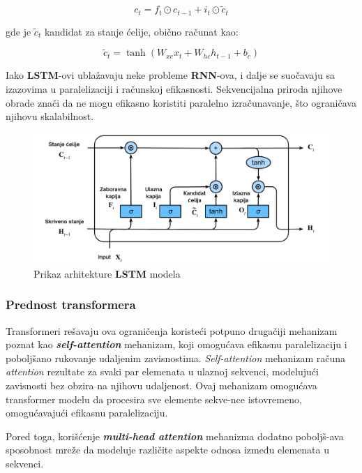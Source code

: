\documentclass[12pt]{article}
\begin{document}
   \[ c_t = f_t \odot c_{t-1} + i_t \odot \tilde{c}_t \]

   gde je \( \tilde{c}_t \) kandidat za stanje ćelije, obično računat kao:

   \[ \tilde{c}_t = \tanh(W_{xc} x_t + W_{hc} h_{t-1} + b_c) \]

   Iako \textbf{LSTM}-ovi ublažavaju neke probleme \textbf{RNN}-ova, i dalje se suočavaju sa 
   izazovima u paralelizaciji i računskoj efikasnosti. Sekvencijalna priroda njihove
   obrade znači da ne mogu efikasno koristiti paralelno izračunavanje, što ograničava njihovu 
   skalabilnost.

   \begin{figure}[h!]
      \centering
      \vspace{1.5cm} %
      \includegraphics[width=1\textwidth]{lstm.png}
      \caption{Prikaz arhitekture \textbf{LSTM} modela}
      \label{fig:lstm}
   \end{figure}

   \subsubsection{Prednost transformera}
   Transformeri rešavaju ova ograničenja koristeći potpuno drugačiji mehanizam poznat kao 
   \textbf{\textit{self-attention}} mehanizam, koji omogućava efikasnu paralelizaciju i poboljšano 
   rukovanje udaljenim zavisnostima. \textit{Self-attention} mehanizam računa \textit{attention} 
   rezultate za svaki par elemenata u ulaznoj sekvenci, modelujući zavisnosti bez obzira na njihovu
   udaljenost. Ovaj mehanizam omogućava transformer modelu da procesira sve elemente 
   sekve-nce istovremeno, omogućavajući efikasnu paralelizaciju. 
   
   Pored toga, korišćenje \textbf{\textit{multi-head attention}} mehanizma dodatno poboljš-ava 
   sposobnost mreže da modeluje različite aspekte odnosa između elemenata u sekvenci.
\end{document}
